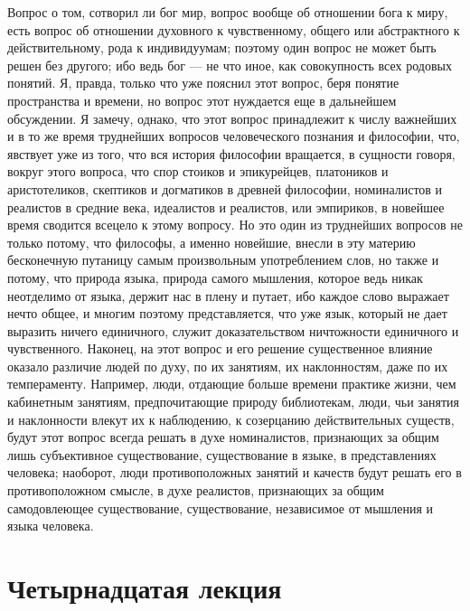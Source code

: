 \documentclass[12pt]{article}
\begin{document}
Вопрос о том, сотворил ли бог мир, вопрос вообще об отношении бога к миру, есть вопрос об отношении духовного к чувственному, общего или абстрактного к действительному, рода к индивидуумам; поэтому один вопрос не может быть решен без другого; ибо ведь бог --- не что иное, как совокупность всех родовых понятий. Я, правда, только что уже пояснил этот вопрос, беря понятие пространства и времени, но вопрос этот нуждается еще в дальнейшем обсуждении. Я замечу, однако, что этот вопрос принадлежит к числу важнейших и в то же время труднейших вопросов человеческого познания и философии, что, явствует уже из того, что вся история философии вращается, в сущности говоря, вокруг этого вопроса, что спор стоиков и эпикурейцев, платоников и аристотеликов, скептиков и догматиков в древней философии, номиналистов и реалистов в средние века, идеалистов и реалистов, или эмпириков, в новейшее время сводится всецело к этому вопросу. Но это один из труднейших вопросов не только потому, что философы, а именно новейшие, внесли в эту материю бесконечную путаницу самым произвольным употреблением слов, но также и потому, что природа языка, природа самого мышления, которое ведь никак неотделимо от языка, держит нас в плену и путает, ибо каждое слово выражает нечто общее, и многим поэтому представляется, что уже язык, который не дает выразить ничего единичного, служит доказательством ничтожности единичного и чувственного. Наконец, на этот вопрос и его решение существенное влияние оказало различие людей по духу, по их занятиям, их наклонностям, даже по их темпераменту. Например, люди, отдающие больше времени практике жизни, чем кабинетным занятиям, предпочитающие природу библиотекам, люди, чьи занятия и наклонности влекут их к наблюдению, к созерцанию действительных существ, будут этот вопрос всегда решать в духе номиналистов, признающих за общим лишь субъективное существование, существование в языке, в представлениях человека; наоборот, люди противоположных занятий и качеств будут решать его в противоположном смысле, в духе реалистов, признающих за общим самодовлеющее существование, существование, независимое от мышления и языка человека. 

\section*{Четырнадцатая лекция}
\end{document}

